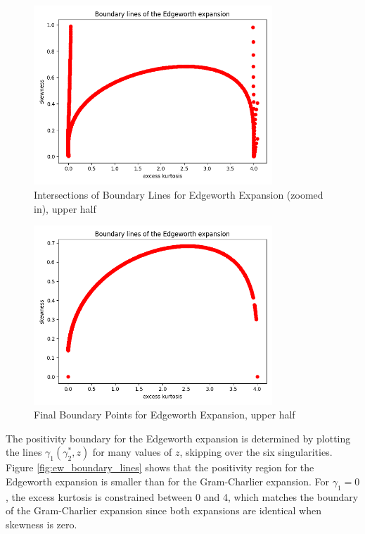 \begin{figure}[h]
    \centering
    \includegraphics[width=0.8\textwidth]{img/edgeworth_positivity_boundary_intersections_4.png}
    \caption{Intersections of Boundary Lines for Edgeworth Expansion (zoomed in), upper half}
    \label{fig:ew_boundary_intersections_4}
\end{figure}
\begin{figure}[h]
    \centering
    \includegraphics[width=0.8\textwidth]{img/edgeworth_positivity_boundary_intersections_7.png}
    \caption{Final Boundary Points for Edgeworth Expansion, upper half}
    \label{fig:ew_boundary_intersections_7}
\end{figure}

The positivity boundary for the Edgeworth expansion is determined by plotting the lines $\gamma_1(\gamma_2^*, z)$ for many values of $z$, skipping over the six singularities. Figure \ref{fig:ew_boundary_lines} shows that the positivity region for the Edgeworth expansion is smaller than for the Gram-Charlier expansion. For $\gamma_1 = 0$, the excess kurtosis is constrained between 0 and 4, which matches the boundary of the Gram-Charlier expansion since both expansions are identical when skewness is zero.

